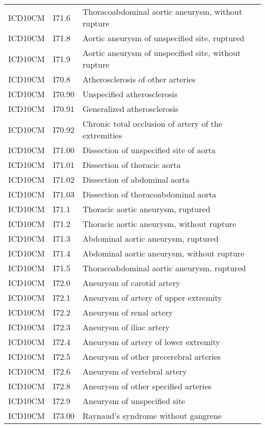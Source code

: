 \begin{longtable}{p{}p{}p{}}
  ICD10CM & I71.6 & Thoracoabdominal aortic aneurysm, without rupture \\ 
  ICD10CM & I71.8 & Aortic aneurysm of unspecified site, ruptured \\ 
  ICD10CM & I71.9 & Aortic aneurysm of unspecified site, without rupture \\ 
  ICD10CM & I70.8 & Atherosclerosis of other arteries \\ 
  ICD10CM & I70.90 & Unspecified atherosclerosis \\ 
  ICD10CM & I70.91 & Generalized atherosclerosis \\ 
  ICD10CM & I70.92 & Chronic total occlusion of artery of the extremities \\ 
  ICD10CM & I71.00 & Dissection of unspecified site of aorta \\ 
  ICD10CM & I71.01 & Dissection of thoracic aorta \\ 
  ICD10CM & I71.02 & Dissection of abdominal aorta \\ 
  ICD10CM & I71.03 & Dissection of thoracoabdominal aorta \\ 
  ICD10CM & I71.1 & Thoracic aortic aneurysm, ruptured \\ 
  ICD10CM & I71.2 & Thoracic aortic aneurysm, without rupture \\ 
  ICD10CM & I71.3 & Abdominal aortic aneurysm, ruptured \\ 
  ICD10CM & I71.4 & Abdominal aortic aneurysm, without rupture \\ 
  ICD10CM & I71.5 & Thoracoabdominal aortic aneurysm, ruptured \\ 
  ICD10CM & I72.0 & Aneurysm of carotid artery \\ 
  ICD10CM & I72.1 & Aneurysm of artery of upper extremity \\ 
  ICD10CM & I72.2 & Aneurysm of renal artery \\ 
  ICD10CM & I72.3 & Aneurysm of iliac artery \\ 
  ICD10CM & I72.4 & Aneurysm of artery of lower extremity \\ 
  ICD10CM & I72.5 & Aneurysm of other precerebral arteries \\ 
  ICD10CM & I72.6 & Aneurysm of vertebral artery \\ 
  ICD10CM & I72.8 & Aneurysm of other specified arteries \\ 
  ICD10CM & I72.9 & Aneurysm of unspecified site \\ 
  ICD10CM & I73.00 & Raynaud's syndrome without gangrene \\ 

\end{longtable}
